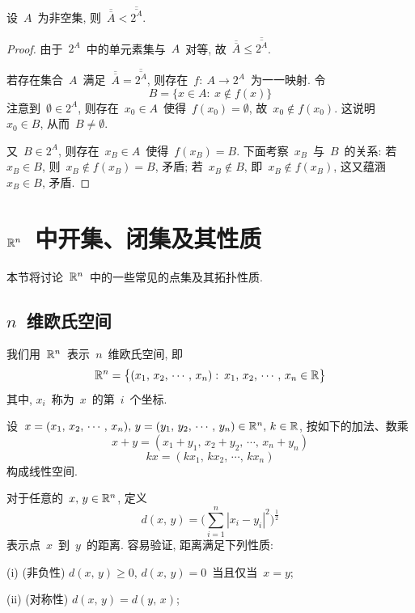 \begin{theorem}
设~$A$~为非空集, 则~$\overline{\overline{A}} < \overline{\overline{2^A}}$.
\end{theorem}

\begin{proof}
由于~$2^A$~中的单元素集与~$A$~对等, 故~$\overline{\overline{A}} \leqslant \overline{\overline{2^A}}$.

若存在集合~$A$~满足~$\overline{\overline{A}} = \overline{\overline{2^A}}$, 则存在~$f: \: A \rightarrow 2^A$~为一一映射. 令
\[
B = \{x \in A: \: x \notin f(x)\}
\]
注意到~$\emptyset \in 2^A$, 则存在~$x_0 \in A$~使得~$f(x_0) = \emptyset$, 故~$x_0 \notin f(x_0)$. 这说明~$x_0 \in B$, 从而~$B \neq \emptyset$.

又~$B \in 2^A$, 则存在~$x_B \in A$~使得~$f(x_B) = B$. 下面考察~$x_B$~与~$B$~的关系: 若~$x_B \in B$, 则~$x_B \notin f(x_B) = B$, 矛盾; 若~$x_B \notin B$, 即~$x_B \notin f(x_B)$, 这又蕴涵~$x_B \in B$, 矛盾.
\end{proof}



\section{$\mathbb{R}^n$~中开集、闭集及其性质}

本节将讨论~$\mathbb{R}^n$~中的一些常见的点集及其拓扑性质.

\subsection{$n$~维欧氏空间}

我们用~$\mathbb{R}^n$~表示~$n$~维欧氏空间, 即
\[
\mathbb{R}^n = \big\{(x_1,\,x_2,\, \cdots, \, x_n): \: x_1,\,x_2,\, \cdots, \, x_n \in \mathbb{R}\big\}
\]
其中, $x_i$~称为~$x$~的第~$i$~个坐标.

设~$x = (x_1,\,x_2,\, \cdots, \, x_n), \, y = (y_1,\,y_2,\, \cdots, \, y_n) \in \mathbb{R}^n, \, k \in \mathbb{R}$, 按如下的加法、数乘
\[
x + y = (x_1 + y_1,\, x_2 + y_2, \, \cdots, \, x_n + y_n)
\]
\[
k x = (k x_1,\, k x_2, \, \cdots, \, k x_n)
\]
构成线性空间.

对于任意的~$x,\,y \in \mathbb{R}^n$, 定义
\[
d(x,\,y) = \Big( \sum_{i=1} ^n |x_i - y_i|^2 \Big)^\frac{1}{2}
\]
表示点~$x$~到~$y$~的距离. 容易验证, 距离满足下列性质:

(i) (非负性) $d(x,\,y) \geqslant 0$, $d(x,\,y) = 0$~当且仅当~$x = y$;

(ii) (对称性) $d(x,\,y) = d(y,\,x)$;

